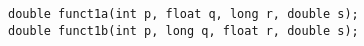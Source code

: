 \documentclass{article}
\begin{document}
\texttt{double funct1a(int p, float q, long r, double s);} \\
\texttt{double funct1b(int p, long q, float r, double s);}
\end{document}
